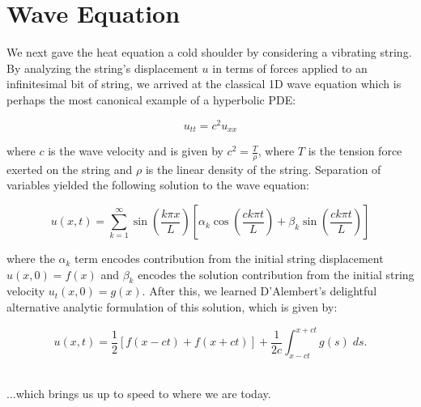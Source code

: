 \documentclass[letterpaper,10pt]{article}
\begin{document}
    \section{Wave Equation}\label{sec:wave-equation}
    We next gave the heat equation a cold shoulder by considering a vibrating string. By analyzing the string's 
    displacement $u$ in terms of forces applied to an infinitesimal bit of string, we arrived at the classical 1D wave 
    equation which is perhaps the most canonical example of a hyperbolic PDE:

    $$
    u_{tt} = c^2 u_{xx}
    $$

    \noindent where $c$ is the wave velocity and is given by $c^2 = \frac{T}{\rho}$, where $T$ is the tension force 
    exerted on the string and $\rho$ is the linear density of the string. Separation of variables yielded the following
    solution to the wave equation:

    $$
    u(x, t) = \sum\limits_{k=1}^{\infty}{\sin{\left(\frac{k \pi x}{L}\right)} \left[ \alpha_k \cos{\left( \frac{c k \pi t}{L}\right)} + \beta_k \sin{\left( \frac{c k \pi t}{L}\right)}\right]}
    $$

    \noindent where the $\alpha_k$ term encodes contribution from the initial string displacement $u(x, 0) = f(x)$ and 
    $\beta_k$ encodes the solution contribution from the initial string velocity $u_t(x, 0) = g(x)$. After this, we 
    learned D'Alembert's delightful alternative analytic formulation of this solution, which is given by:

    $$
    u(x, t) = \frac{1}{2} \left[f(x - ct) + f(x + ct) \right] + \frac{1}{2c} \int_{x - ct}^{x + ct}{g(s)\; ds}.
    $$

    \ \\
    ...which brings us up to speed to where we are today.
\end{document}
